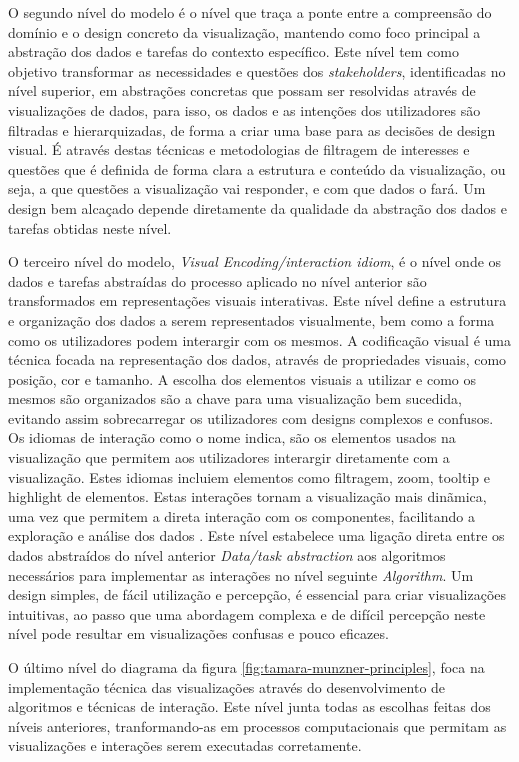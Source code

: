 O segundo nível do modelo é o nível que traça a ponte entre a compreensão do domínio e o design concreto da visualização, mantendo como foco principal a abstração dos dados e tarefas  do contexto específico. Este nível tem como objetivo transformar as necessidades e questões dos \textit{stakeholders}, identificadas no nível superior, em abstrações concretas que possam ser resolvidas através de visualizações de dados, para isso, os dados e as intenções dos utilizadores são filtradas e hierarquizadas, de forma a criar uma base para as decisões de design visual. 
É através destas técnicas e metodologias de filtragem de interesses e questões que é definida de forma clara a estrutura e conteúdo da visualização, ou seja, a que questões a visualização vai responder, e com que dados o fará. Um design bem alcaçado depende diretamente da qualidade da abstração dos dados e tarefas obtidas neste nível.

O terceiro nível do modelo, \textit{Visual Encoding/interaction idiom}, é o nível onde os dados e tarefas abstraídas do processo aplicado no nível anterior são transformados em representações visuais interativas. Este nível define a estrutura e organização dos dados a serem representados visualmente, bem como a forma como os utilizadores podem interargir com os mesmos.
A codificação visual é uma técnica focada na representação dos dados, através de propriedades visuais, como posição, cor e tamanho. A escolha dos elementos visuais a utilizar e como os mesmos são organizados são a chave para uma visualização bem sucedida, evitando assim sobrecarregar os utilizadores com designs complexos e confusos.
Os idiomas de interação como o nome indica, são os elementos usados na visualização que permitem aos utilizadores interargir diretamente com a visualização. Estes idiomas incluiem elementos como filtragem, zoom, tooltip e highlight de elementos. Estas interações tornam a visualização mais dinãmica, uma vez que permitem a direta interação com os componentes, facilitando a exploração e análise dos dados \cite{figueiras2015towards}.
Este nível estabelece uma ligação direta entre os dados abstraídos do nível anterior \textit{Data/task abstraction} aos algoritmos necessários para implementar as interações no nível seguinte \textit{Algorithm}. Um design simples, de fácil utilização e percepção, é essencial para criar visualizações intuitivas, ao passo que uma abordagem complexa e de difícil percepção neste nível pode resultar em visualizações confusas e pouco eficazes.

O último nível do diagrama da figura \ref{fig:tamara-munzner-principles}, foca na implementação técnica das visualizações através do desenvolvimento de algoritmos e técnicas de interação. Este nível junta todas as escolhas feitas dos níveis anteriores, tranformando-as em processos computacionais que permitam as visualizações e interações serem executadas corretamente.

